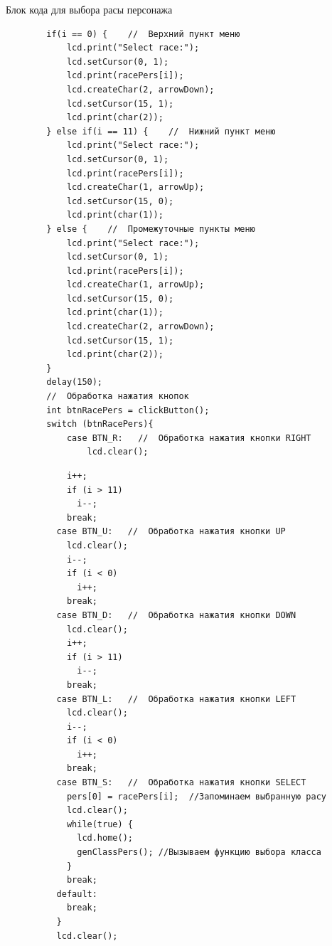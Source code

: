 \documentclass[12pt,a4paper,mathserif]{beamer}
\begin{document}
\begin{frame}[fragile]{{\small Блок кода для выбора расы персонажа}}
    \begin{adjustbox}{width=\textwidth,height=\someheight,keepaspectratio}
    \begin{minipage}{1.1\linewidth}
    \begin{verbatim}
        if(i == 0) {    //  Верхний пункт меню
            lcd.print("Select race:");
            lcd.setCursor(0, 1);
            lcd.print(racePers[i]);
            lcd.createChar(2, arrowDown);
            lcd.setCursor(15, 1);
            lcd.print(char(2));
        } else if(i == 11) {    //  Нижний пункт меню
            lcd.print("Select race:");
            lcd.setCursor(0, 1);
            lcd.print(racePers[i]);
            lcd.createChar(1, arrowUp);
            lcd.setCursor(15, 0);
            lcd.print(char(1));
        } else {    //  Промежуточные пункты меню
            lcd.print("Select race:");
            lcd.setCursor(0, 1);
            lcd.print(racePers[i]);
            lcd.createChar(1, arrowUp);
            lcd.setCursor(15, 0);
            lcd.print(char(1));
            lcd.createChar(2, arrowDown);
            lcd.setCursor(15, 1);
            lcd.print(char(2));
        }
        delay(150);
        //  Обработка нажатия кнопок
        int btnRacePers = clickButton();
        switch (btnRacePers){
            case BTN_R:   //  Обработка нажатия кнопки RIGHT
                lcd.clear();
    \end{verbatim}
    \end{minipage}
    \hfill
    \begin{minipage}{1.1\linewidth}
    \begin{verbatim}
            i++;
            if (i > 11)
              i--;
            break;
          case BTN_U:   //  Обработка нажатия кнопки UP
            lcd.clear();
            i--;
            if (i < 0)
              i++;
            break;
          case BTN_D:   //  Обработка нажатия кнопки DOWN
            lcd.clear();
            i++;
            if (i > 11)
              i--;
            break;
          case BTN_L:   //  Обработка нажатия кнопки LEFT
            lcd.clear();
            i--;
            if (i < 0)
              i++;
            break;
          case BTN_S:   //  Обработка нажатия кнопки SELECT
            pers[0] = racePers[i];  //Запоминаем выбранную расу
            lcd.clear();
            while(true) {
              lcd.home();
              genClassPers(); //Вызываем функцию выбора класса
            }
            break;
          default:
            break;
          }
          lcd.clear();
    \end{verbatim}
    \end{minipage}
    \end{adjustbox}
\end{frame}
\end{document}
